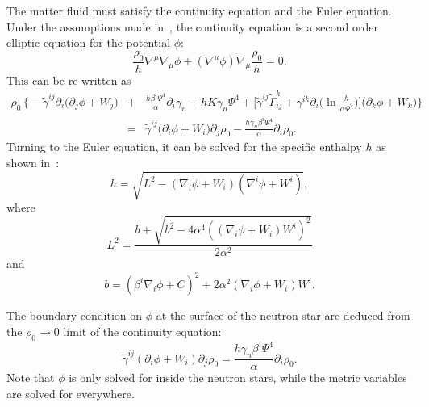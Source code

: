 The matter fluid must satisfy the continuity equation and the Euler
equation. 
Under the assumptions made in~\cite{Tichy:2011gw}, the continuity equation is a second order elliptic equation for the potential $\phi$:
\begin{equation}
\label{eq:Continuity1}
\frac{\rho_0}{h}\nabla^{\mu}\nabla_{\mu}\phi+\left(\nabla^{\mu}\phi\right)\nabla_{\mu}\frac{\rho_0}{h}=0.
\end{equation}
This can be re-written as
\begin{eqnarray}
\label{eq:Continuity2}
\rho_0\,\bigg\{\!\!-\tilde{\gamma}^{ij}\partial_i\big(\partial_j\phi+W_j\big)  &+& \frac{h\beta^i\Psi^4}{\alpha}\partial_i\gamma_n + hK\gamma_n\Psi^4+\Big[\tilde{\gamma}^{ij}\tilde{\Gamma}^k_{ij}+\gamma^{ik}\partial_i\big(\ln \frac{h}{\alpha\Psi^2}\big)\Big] 
\big(\partial_k\phi+W_k\big) \bigg\} \nonumber\\
&=&\tilde{\gamma}^{ij}\big(\partial_i\phi+W_i\big)\partial_j\rho_0 - \frac{h\gamma_n\beta^i\Psi^4}{\alpha}\partial_i\rho_0.
\label{eq:Continuity}
\end{eqnarray}
Turning to the Euler equation, it can be solved for the specific
enthalpy $h$ as shown in~\cite{Tichy:2011gw}:
\begin{equation}\label{eq:hSoln}
h = \sqrt{L^2 -
  \left(\nabla_i\phi+W_i\right)\left(\nabla^i\phi+W^i\right)},
\end{equation}
where
\begin{equation}
L^2 =
\frac{b+\sqrt{b^2-4\alpha^4\left(\left(\nabla_i\phi+W_i\right)W^i\right)^2}}{2\alpha^2}
\end{equation}
and
\begin{equation}
b =
\left(\beta^i\nabla_i\phi+C\right)^2+2\alpha^2\left(\nabla_i\phi+W_i\right)W^i.
\end{equation}

The boundary condition on $\phi$ at the surface of the neutron star are deduced from the $\rho_0\rightarrow 0$ limit of the continuity equation:
\begin{equation}
\tilde{\gamma}^{ij}\left(\partial_i\phi+W_i\right)\partial_j\rho_0=\frac{h\gamma_n\beta^i\Psi^4}{\alpha}\partial_i\rho_0.
\end{equation}
Note that $\phi$ is only solved for inside the neutron stars, while
the metric variables are solved for everywhere.

